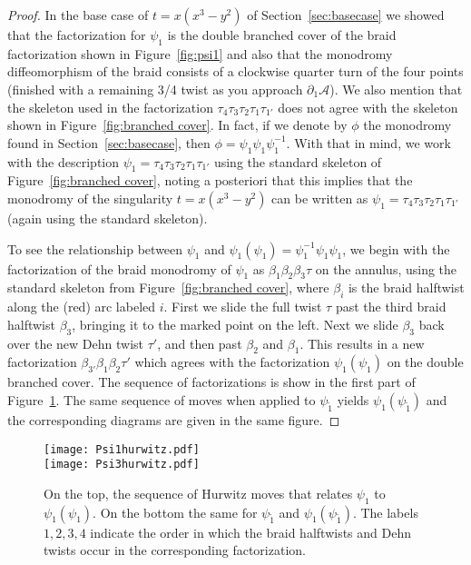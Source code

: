 \documentclass[11pt,letterpaper,reqno]{amsart}
\theoremstyle{remark}
\def \A {\mathcal{A}}
\def \t {\tau}
\def \b {\beta}
\begin{document}
\begin{proof}
In the base case of $t=x(x^3 - y^2)$ of Section~\ref{sec:basecase} we showed that the factorization for $\psi_1$ is the double branched cover of the braid factorization shown in Figure~\ref{fig:psi1} and also that the monodromy diffeomorphism of the braid consists of a clockwise quarter turn of the four points (finished with a remaining 3/4 twist as you approach $\partial_1\A$). We also mention that the skeleton used in the factorization $\tau_4 \tau_3 \tau_2 \tau_1 \tau_{1'}$ does not agree with the skeleton shown in Figure~\ref{fig:branched cover}. In fact, if we denote by $\phi$ the monodromy found in Section~\ref{sec:basecase}, then $\phi = \psi_1 \psi_1 \psi_1^{-1}$. With that in mind, we work with the description  $\psi_1 = \tau_4 \tau_3 \tau_2 \tau_1 \tau_{1'}$ using the standard skeleton of Figure~\ref{fig:branched cover}, noting a posteriori that this implies that the monodromy of the singularity  $t=x(x^3 - y^2)$ can be written as $\psi_1 = \tau_4 \tau_3 \tau_2 \tau_1 \tau_{1'}$ (again using the standard skeleton).

To see the relationship between $\psi_1$ and $\psi_1(\psi_1) =  \psi_1^{-1} \psi_1 \psi_1$, we begin with the factorization of the braid monodromy of $\psi_1$ as $\b_1 \b_2 \b_3 \t$ on the annulus, using the standard skeleton from Figure~\ref{fig:branched cover}, where $\b_i$ is the braid halftwist along the (red) arc labeled $i$. First we slide the full twist $\t$ past the third braid halftwist $\b_3$, bringing it to the marked point on the left. Next we slide $\b_3$ back over the new Dehn twist $\t'$, and then past $\b_2$ and $\b_1$. This results in a new factorization $\b_{3'} \b_1 \b_2 \t'$ which agrees with the factorization $\psi_1(\psi_1)$ on the double branched cover. The sequence of factorizations is show in the first part of Figure~\ref{fig:hurwitz-conjugations}. The same sequence of moves when applied to $\psi_{\tilde{1}}$ yields $\psi_1 (\psi_{\tilde{1}})$ and the corresponding diagrams are given in the same figure.
\end{proof}

\begin{figure}
    \centering
    \texttt{[image: Psi1hurwitz.pdf]}\\
    \vspace{0.4in}
    \texttt{[image: Psi3hurwitz.pdf]}
    \caption{On the top, the sequence of Hurwitz moves that relates $\psi_1$ to $\psi_1(\psi_1)$. On the bottom the same for $\psi_{\tilde{1}}$ and $\psi_1(\psi_{\tilde{1}})$. The labels $1, 2, 3, 4$ indicate the order in which the braid halftwists and Dehn twists occur in the corresponding factorization. }
    \label{fig:hurwitz-conjugations}
\end{figure}
\end{document}
